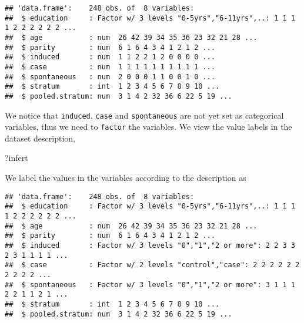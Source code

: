 \documentclass[]{book}
\newenvironment{Shaded}{\begin{snugshade}}{\end{snugshade}}
\newcommand{\KeywordTok}[1]{\textcolor[rgb]{0.13,0.29,0.53}{\textbf{{#1}}}}
\newcommand{\DataTypeTok}[1]{\textcolor[rgb]{0.13,0.29,0.53}{{#1}}}
\newcommand{\DecValTok}[1]{\textcolor[rgb]{0.00,0.00,0.81}{{#1}}}
\newcommand{\StringTok}[1]{\textcolor[rgb]{0.31,0.60,0.02}{{#1}}}
\newcommand{\NormalTok}[1]{{#1}}
\theoremstyle{definition}
\theoremstyle{definition}
\theoremstyle{remark}
\begin{document}
\begin{verbatim}
## 'data.frame':    248 obs. of  8 variables:
##  $ education     : Factor w/ 3 levels "0-5yrs","6-11yrs",..: 1 1 1 1 2 2 2 2 2 2 ...
##  $ age           : num  26 42 39 34 35 36 23 32 21 28 ...
##  $ parity        : num  6 1 6 4 3 4 1 2 1 2 ...
##  $ induced       : num  1 1 2 2 1 2 0 0 0 0 ...
##  $ case          : num  1 1 1 1 1 1 1 1 1 1 ...
##  $ spontaneous   : num  2 0 0 0 1 1 0 0 1 0 ...
##  $ stratum       : int  1 2 3 4 5 6 7 8 9 10 ...
##  $ pooled.stratum: num  3 1 4 2 32 36 6 22 5 19 ...
\end{verbatim}

We notice that \texttt{induced}, \texttt{case} and \texttt{spontaneous}
are not yet set as categorical variables, thus we need to
\texttt{factor} the variables. We view the value labels in the dataset
description,

\begin{Shaded}
\begin{Highlighting}[]
\NormalTok{?infert}
\end{Highlighting}
\end{Shaded}

We label the values in the variables according to the description as

\begin{Shaded}
\end{Shaded}

\begin{verbatim}
## 'data.frame':    248 obs. of  8 variables:
##  $ education     : Factor w/ 3 levels "0-5yrs","6-11yrs",..: 1 1 1 1 2 2 2 2 2 2 ...
##  $ age           : num  26 42 39 34 35 36 23 32 21 28 ...
##  $ parity        : num  6 1 6 4 3 4 1 2 1 2 ...
##  $ induced       : Factor w/ 3 levels "0","1","2 or more": 2 2 3 3 2 3 1 1 1 1 ...
##  $ case          : Factor w/ 2 levels "control","case": 2 2 2 2 2 2 2 2 2 2 ...
##  $ spontaneous   : Factor w/ 3 levels "0","1","2 or more": 3 1 1 1 2 2 1 1 2 1 ...
##  $ stratum       : int  1 2 3 4 5 6 7 8 9 10 ...
##  $ pooled.stratum: num  3 1 4 2 32 36 6 22 5 19 ...
\end{verbatim}
\end{document}
